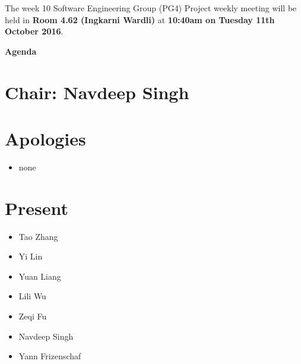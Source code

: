 \documentclass[11pt, a4paper]{article}
\begin{document}

\noindent The week 10 Software Engineering Group (PG4) Project weekly meeting will be held in {\bf Room 4.62 (Ingkarni Wardli)} at {\bf 10:40am on Tuesday 11th October 2016}.



\vspace*{15pt}

\begin{center}

\huge \bf Agenda

\end{center}




\section*{Chair: Navdeep Singh}

\vspace*{10pt}




\section{Apologies}

\begin{itemize}

\item none

\end{itemize}




\section{Present}

\begin{itemize}

\item Tao Zhang

\item Yi Lin

\item Yuan Liang

\item Lili Wu

\item Zeqi Fu

\item Navdeep Singh

\item Yann Frizenschaf

\end{itemize}
\end{document}
